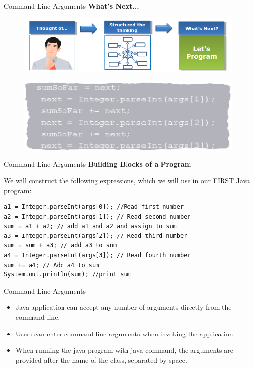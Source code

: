 \documentclass[12pt]{beamer}
\begin{document}
\begin{frame}{Command-Line Arguments}
 \textbf{What's Next...}
 \begin{figure}[H]
 \begin{center}
   \includegraphics[scale=.3]{what-next.png}   
 \end{center}
  \end{figure}
 \begin{figure}[H]
 \begin{center}
   \includegraphics[scale=.3]{what-next-solution.png}   
 \end{center}
  \end{figure}
\end{frame}

\begin{frame}[fragile]{Command-Line Arguments}
 \textbf{Building Blocks of a Program}
 
 \vspace{1pc}
 We will construct the following expressions, which we will use in our FIRST Java program:
 \begin{lstlisting}[numbers=none]
a1 = Integer.parseInt(args[0]); //Read first number
a2 = Integer.parseInt(args[1]); // Read second number
sum = a1 + a2; // add a1 and a2 and assign to sum
a3 = Integer.parseInt(args[2]); // Read third number
sum = sum + a3; // add a3 to sum
a4 = Integer.parseInt(args[3]); // Read fourth number
sum += a4; // Add a4 to sum
System.out.println(sum); //print sum
 \end{lstlisting}
\end{frame}

\begin{frame}{Command-Line Arguments}
 \begin{itemize}
  \item Java application can accept any number of arguments directly from the command-line. 
  \item Users can enter command-line arguments when invoking the application. 
  \item When running the java program with java command, the arguments are provided after the name of the class, separated by space.
 \end{itemize}
\end{frame}
\end{document}
